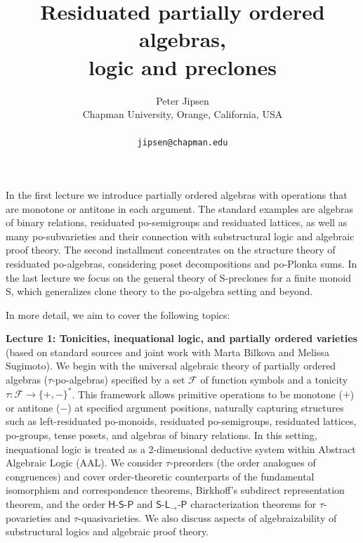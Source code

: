 \documentclass[a4paper]{article} %
\date{} %
\begin{document}
\setcounter{page}{1} %

\title{Residuated partially ordered algebras,\\ logic and preclones}

\author{Peter Jipsen \\ %
       Chapman University, Orange, California, USA\\ \\ %
       \texttt{jipsen@chapman.edu} %
       }%

\maketitle



\noindent
In the first lecture we introduce partially ordered algebras with operations that are monotone or antitone in each argument. The standard examples are algebras of binary relations, residuated po-semigroups and residuated lattices, as well as many po-subvarieties and their connection with substructural logic and algebraic proof theory. 
The second installment concentrates on the structure theory of residuated po-algebras, considering poset decompositions and po-Plonka sums. 
In the last lecture we focus on the general theory of S-preclones for a finite monoid S, which generalizes clone theory to the po-algebra setting and beyond.

In more detail, we aim to cover the following topics:

\medskip

\noindent
\textbf{Lecture 1: Tonicities, inequational logic, and partially ordered varieties} (based on standard sources and joint work with Marta Bilkova and Melissa Sugimoto).
We begin with the universal algebraic theory of partially ordered algebras ($\tau$-po-algebras) specified by a set $\mathcal F$ of function symbols and a tonicity $\tau: \mathcal F \to \{+, -\}^*$. This framework allows primitive operations to be monotone ($+$) or antitone ($-$) at specified argument positions, naturally capturing structures such as left-residuated po-monoids, residuated po-semigroups, residuated lattices, po-groups, tense posets, and algebras of binary relations. In this setting, inequational logic is treated as a 2-dimensional deductive system within Abstract Algebraic Logic (AAL). We consider $\tau$-preorders (the order analogues of congruences) and cover order-theoretic counterparts of the fundamental isomorphism and correspondence theorems, Birkhoff's subdirect representation theorem, and the order $\mathsf{H}\text{-}\mathsf{S}\text{-}\mathsf{P}$ and $\mathsf{S}\text{-}\mathsf{L}_{\to}\text{-}\mathsf{P}$ characterization theorems for $\tau$-povarieties and $\tau$-quasivarieties. We also discuss aspects of algebraizability of substructural logics and algebraic proof theory.
\end{document}
